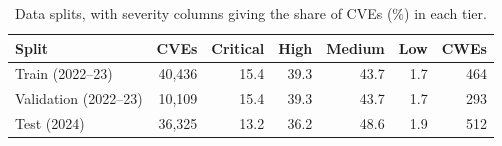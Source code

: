 \begin{table}[t]
\centering
\caption{Data splits, with severity columns giving the share of CVEs (\%) in each tier.}
\label{tab:data}
\small
\begin{tabular}{lrrrrrr}
\toprule
Split & CVEs & Critical & High & Medium & Low & CWEs \\
\midrule
Train (2022--23) & 40{,}436 & 15.4 & 39.3 & 43.7 & 1.7 & 464 \\
Validation (2022--23) & 10{,}109 & 15.4 & 39.3 & 43.7 & 1.7 & 293 \\
Test (2024) & 36{,}325 & 13.2 & 36.2 & 48.6 & 1.9 & 512 \\
\bottomrule
\end{tabular}
\end{table}
